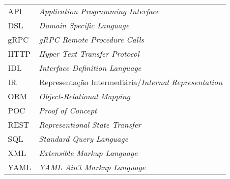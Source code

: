 \begin{longtable}{ll}
  API & \textit{Application Programming Interface} \\
  DSL & \textit{Domain Specific Language} \\
  gRPC & \textit{gRPC Remote Procedure Calls} \\
  HTTP & \textit{Hyper Text Transfer Protocol} \\
  IDL & \textit{Interface Definition Language} \\
  IR & Representação Intermediária/\textit{Internal Representation} \\
  ORM & \textit{Object-Relational Mapping} \\
  POC & \textit{Proof of Concept} \\
  REST & \textit{Representional State Transfer} \\
  SQL & \textit{Standard Query Language} \\
  XML & \textit{Extensible Markup Language} \\
  YAML & \textit{YAML Ain't Markup Language} \\
\end{longtable}

